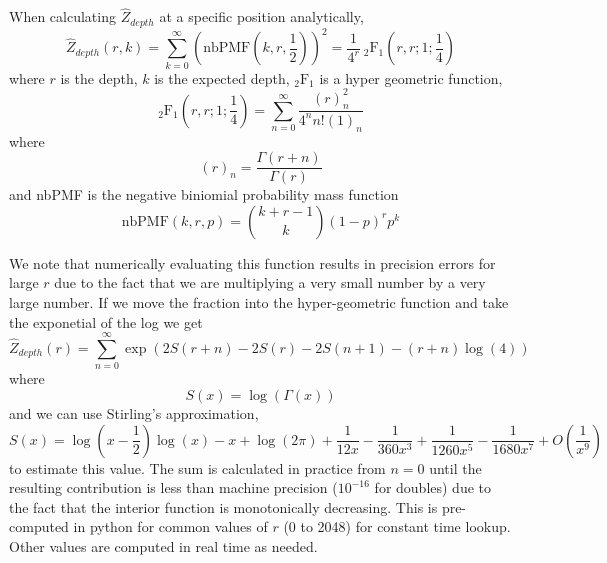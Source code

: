 \documentclass[phd,tocprelim]{cornell}
\begin{document}
When calculating $\hat{Z}_{depth}$ at a specific position analytically,
\begin{equation}
    \hat{Z}_{depth}(r,k) = \sum_{k=0}^{\infty} \left(\mbox{nbPMF}\left(k,r,\frac{1}{2}\right)\right)^{2} = \frac{1}{4^{r}} \ _{2}\mbox{F}_{1}\left(r,r;1;\frac{1}{4}\right)
\end{equation}
where $r$ is the depth, $k$ is the expected depth, $_{2}\mbox{F}_{1}$ is a hyper geometric function,
\begin{equation}
    _{2}\mbox{F}_{1}\left(r,r;1;\frac{1}{4}\right) = \sum_{n=0}^{\infty} \frac{(r)^{2}_{n}}{4^{n}n!(1)_{n}}
\end{equation}
where
\begin{equation}
    (r)_{n} = \frac{\Gamma(r+n)}{\Gamma(r)}    
\end{equation}
and nbPMF is the negative biniomial probability mass function
\begin{equation}
    \mbox{nbPMF}\left(k,r,p\right) = {k+r-1 \choose k} (1-p)^{r}p^{k}
\end{equation}

We note that numerically evaluating this function results in precision errors for large $r$ due to the fact that we are multiplying a very small number by a very large number. If we move the fraction into the hyper-geometric function and take the exponetial of the log we get
\begin{equation}
    \hat{Z}_{depth}(r) = \sum_{n=0}^{\infty} \exp\left(2S(r+n) - 2S(r) - 2S(n+1) - (r+n)\log(4)\right)
\end{equation}
where
\begin{equation}
    S(x) = \log\left(\Gamma(x)\right)
\end{equation}
and we can use Stirling's approximation,
\begin{equation}
    S(x) = \log\left(x - \frac{1}{2}\right)\log(x) - x + \log(2\pi) + \frac{1}{12x} - \frac{1}{360x^{3}} + \frac{1}{1260x^{5}} - \frac{1}{1680x^{7}} + O\left(\frac{1}{x^{9}}\right)
\end{equation}
to estimate this value. The sum is calculated in practice from $n=0$ until the resulting contribution is less than machine precision ($10^{-16}$ for doubles) due to the fact that the interior function is monotonically decreasing. This is pre-computed in python for common values of $r$ (0 to 2048) for constant time lookup. Other values are computed in real time as needed.
\end{document}
